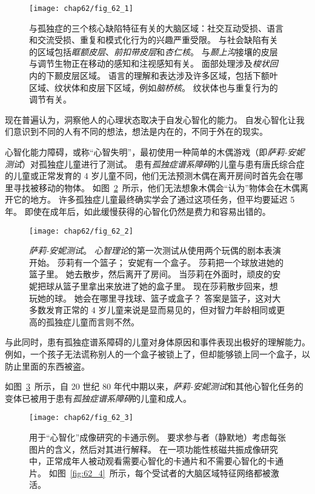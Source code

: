 \begin{figure}[htbp]
	\centering
	\texttt{[image: chap62/fig\_62\_1]}
	\caption{与孤独症的三个核心缺陷特征有关的大脑区域：社交互动受损、语言和交流受损、重复和模式化行为的兴趣严重受限。
		与社会缺陷有关的区域包括\textit{眶额皮层}、\textit{前扣带皮层}和\textit{杏仁核}。
		与\textit{颞上沟}接壤的皮层与调节生物正在移动的感知和注视感知有关。
		面部处理涉及\textit{梭状回}内的下颞皮层区域。
		语言的理解和表达涉及许多区域，包括下额叶区域、纹状体和皮层下区域，例如\textit{脑桥核}。
		纹状体也与重复行为的调节有关。}
	\label{fig:62_1}
\end{figure}


现在普遍认为，洞察他人的心理状态取决于自发心智化的能力。
自发心智化让我们意识到不同的人有不同的想法，想法是内在的，不同于外在的现实。


心智化能力障碍，或称“心智失明”，最初使用一种简单的木偶游戏（即\textit{萨莉-安妮测试}）对孤独症儿童进行了测试。
患有\textit{孤独症谱系障碍}的儿童与患有唐氏综合症的儿童或正常发育的 4 岁儿童不同，他们无法预测木偶在离开房间时首先会在哪里寻找被移动的物体。
如图~\ref{fig:62_2}~所示，他们无法想象木偶会“认为”物体会在木偶离开它的地方。
许多孤独症儿童最终确实学会了通过这项任务，但平均要延迟 5 年。
即使在成年后，如此缓慢获得的心智化仍然是费力和容易出错的。


\begin{figure}[htbp]
	\centering
	\texttt{[image: chap62/fig\_62\_2]}
	\caption{\textit{萨莉-安妮测试}。
		\textit{心智理论}的第一次测试从使用两个玩偶的剧本表演开始。
		莎莉有一个篮子；
		安妮有一个盒子。
		莎莉把一个球放进她的篮子里。
		她去散步，然后离开了房间。
		当莎莉在外面时，顽皮的安妮把球从篮子里拿出来放进了她的盒子里。
		现在莎莉散步回来，想玩她的球。
		她会在哪里寻找球、篮子或盒子？
		答案是篮子，这对大多数发育正常的 4 岁儿童来说是显而易见的，但对智力年龄相同或更高的孤独症儿童而言则不然。}
	\label{fig:62_2}
\end{figure}


与此同时，患有孤独症谱系障碍的儿童对身体原因和事件表现出极好的理解能力。
例如，一个孩子无法谎称别人的一个盒子被锁上了，但却能够锁上同一个盒子，以防止里面的东西被盗。


如图~\ref{fig:62_3}~所示，自 20 世纪 80 年代中期以来，\textit{萨莉-安妮测试}和其他心智化任务的变体已被用于患有\textit{孤独症谱系障碍}的儿童和成人。


\begin{figure}[htbp]
	\centering
	\texttt{[image: chap62/fig\_62\_3]}
	\caption{用于“心智化”成像研究的卡通示例。
		要求参与者（静默地）考虑每张图片的含义，然后对其进行解释。
		在一项功能性核磁共振成像研究中，正常成年人被动观看需要心智化的卡通片和不需要心智化的卡通片。
		如图~\ref{fig:62_4}~所示，每个受试者的大脑区域特征网络都被激活\cite{gallagher2000reading}。}
	\label{fig:62_3}
\end{figure}


